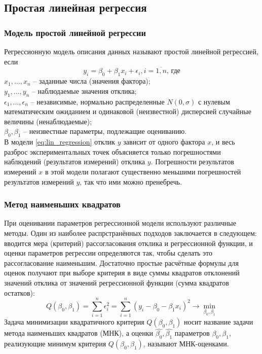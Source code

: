 \documentclass[main.tex]{subfiles}
\begin{document}
\subsection{Простая линейная регрессия}

\subsubsection{Модель простой линейной регрессии}
Регрессионную модель описания данных называют простой линейной регрессией, если
\begin{equation} \label{eq:lin_regression}
	y_i = \beta_0 + \beta_1 x_i + \epsilon_i, i=\overline{1, n} \text{, где}
\end{equation}
$x_1, \dots, x_n$ -- заданные числа (значения фактора); \\
$y_1, \dots, y_n$ -- наблюдаемые значения отклика; \\
$\epsilon_1, \dots, \epsilon_n$ -- независимые, нормально распределенные $N(0, \sigma)$ с нулевым математическим ожиданием и одинаковой (неизвестной) дисперсией случайные величины (ненаблюдаемые); \\
$\beta_0, \beta_1$ -- неизвестные параметры, подлежащие оцениванию. \\
В модели \eqref{eq:lin_regression} отклик $y \text { зависит от одного фактора } x$, и весь разброс экспериментальных  точек объясняется только погрешностями наблюдений (результатов измерений) отклика $y$. Погрешности результатов измерений $x$ в этой модели полагают существенно меньшими погрешностей результатов измерений $y$, так что ими можно пренебречь.

\subsubsection{Метод наименьших квадратов}
При оценивании параметров регрессионной модели используют различные методы. Один из наиболее распрстранённых подходов заключается в следующем: вводится мера (критерий) рассогласования отклика и регрессионной функции, и оценки параметров регрессии определяются так, чтобы сделать это рассогласование наименьшим. Достаточно простые расчётные формулы для оценок получают при выборе критерия в виде суммы квадратов отклонений значений отклика от значений регрессионной функции (сумма квадратов остатков):
\begin{equation} \label{eq:least_squares_method}
	Q(\beta_0, \beta_1) = \sum_{i=1}^{n} \epsilon_{i}^2 = \sum_{i=1}^{n} (y_i - \beta_0 - \beta_1 x_i)^2 \rightarrow \min\limits_{\beta_0, \beta_1}
\end{equation}
Задача минимизации квадратичного критерия $Q(\beta_0, \beta_1)$ носит название задачи метода наименьших квадратов (МНК), а оценки $\hat{\beta_0}, \hat{\beta_1}$ параметров $\beta_0, \beta_1$, реализующие минимум критерия $Q(\beta_0, \beta_1)$, называют МНК-оценками.
\end{document}
